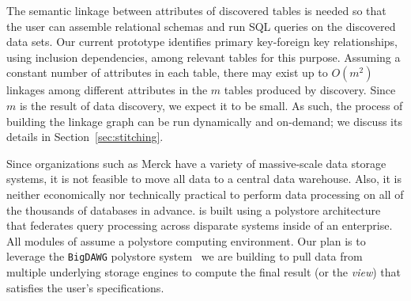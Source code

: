 
The semantic linkage between attributes of discovered tables is needed so that the user can assemble relational schemas and run 
 \textsf{SQL} queries on the discovered data sets. 
%
Our current prototype identifies
primary key-foreign key relationships, using inclusion dependencies, among relevant tables for this purpose.
Assuming a constant number of attributes in each table, there may exist up to $O(m^2)$ linkages among different attributes in the $m$ tables produced by discovery.
%
Since $m$ is the result of data discovery, we expect it to be small.
As such, the process of building the linkage graph can be run dynamically and on-demand; we discuss its details in Section~\ref{sec:stitching}.



Since organizations such as  Merck have a variety of massive-scale data storage systems, it is not feasible to move all data to a central data warehouse. Also, it is neither economically nor technically practical to perform data processing on all of the thousands of databases in advance. 
\dcv is built using a polystore architecture~\cite{DBLP:journals/sigmod/DugganESBHKMMMZ15} that federates query processing across disparate systems inside of an enterprise.  All modules of \dcv assume a polystore computing environment.
Our plan is to leverage the \texttt{BigDAWG} polystore system~\cite{DBLP:journals/pvldb/ElmoreDSBCGHHKK15} we are building to  pull data from multiple underlying storage engines to compute the final result (or the {\em view}) that satisfies the user's specifications.

